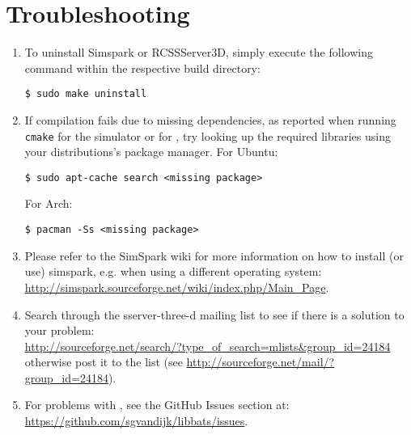 \section{Troubleshooting}
\begin{enumerate}
\item To uninstall Simspark or RCSSServer3D, simply execute the
  following command within the respective build directory:
\begin{verbatim}
$ sudo make uninstall
\end{verbatim}
\item If compilation fails due to missing dependencies, as reported
  when running {\tt cmake} for the simulator or for
  \libbats, try looking up the required libraries using your
  distributions's package manager. For Ubuntu:
\begin{verbatim}
$ sudo apt-cache search <missing package>
\end{verbatim}
  For Arch:
\begin{verbatim}
$ pacman -Ss <missing package>
\end{verbatim}
\item Please refer to the SimSpark wiki for more information on how to
  install (or use) simspark, e.g. when using a different operating
  system:\\
  \url{http://simspark.sourceforge.net/wiki/index.php/Main_Page}.
\item Search through the sserver-three-d mailing list to see if there
  is a solution to your problem:\\
  \url{http://sourceforge.net/search/?type_of_search=mlists&group_id=24184}\\
  otherwise post it to the list (see
  \url{http://sourceforge.net/mail/?group_id=24184}).
\item For problems with \libbats, see the GitHub Issues section at: \\
  \url{https://github.com/sgvandijk/libbats/issues}.
\end{enumerate}

